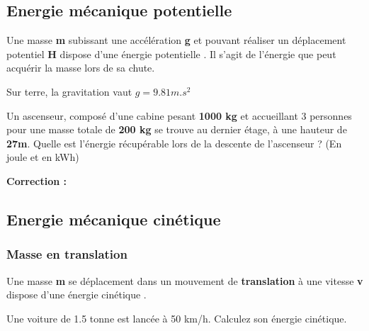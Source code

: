 \documentclass[10pt,fleqn]{article} %
\begin{document}
\subsection{Energie mécanique potentielle}
\begin{defi}
    Une masse \textbf{m} subissant une accélération \textbf{g} et pouvant réaliser un déplacement potentiel \textbf{H} dispose d'une énergie potentielle . Il s'agit de l'énergie que peut acquérir la masse lors de sa chute. 
\end{defi}


Sur terre, la gravitation vaut $g = 9.81 m.s^2$

\begin{exemple}
    Un ascenseur, composé d'une cabine pesant \textbf{1000 kg} et accueillant 3 personnes pour une masse totale de \textbf{200 kg} se trouve au dernier étage, à une hauteur de \textbf{27m}. 
Quelle est l'énergie récupérable lors de la descente de l'ascenseur ? (En joule et en kWh) 

\afaire{}

\correction \textbf{Correction : } 
\end{exemple}


\subsection{Energie mécanique cinétique}
\subsubsection{Masse en translation}
\begin{defi}
  Une masse \textbf{m} se déplacement dans un mouvement de \textbf{translation} à une vitesse \textbf{v} dispose d'une énergie cinétique .   
\end{defi}

\begin{exemple}
    Une voiture de 1.5 tonne est lancée à 50 km/h. Calculez son énergie cinétique. 

\afaire {}

\correction{}
\end{exemple}
\end{document}
